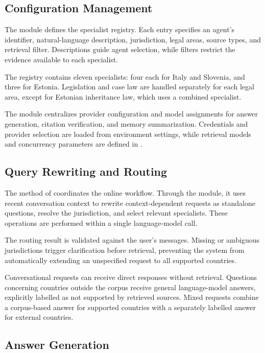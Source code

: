 \documentclass[a4paper,12pt]{report}
\begin{document}
\subsection{Configuration Management}

The  module defines the specialist registry.
Each entry specifies an agent's identifier, natural-language
description, jurisdiction, legal areas, source types, and retrieval
filter. Descriptions guide agent selection, while filters restrict
the evidence available to each specialist.

The registry contains eleven specialists: four each for Italy and
Slovenia, and three for Estonia. Legislation and case law are handled
separately for each legal area, except for Estonian inheritance law,
which uses a combined specialist.

The  module centralizes provider configuration
and model assignments for answer generation, citation verification,
and memory summarization. Credentials and provider selection are
loaded from environment settings, while retrieval models and
concurrency parameters are defined in .

\subsection{Query Rewriting and Routing}

The  method of  coordinates
the online workflow. Through the  module, it uses
recent conversation context to rewrite context-dependent requests
as standalone questions, resolve the jurisdiction, and select
relevant specialists. These operations are performed within a
single language-model call.

The routing result is validated against the user's messages.
Missing or ambiguous jurisdictions trigger clarification before
retrieval, preventing the system from automatically extending
an unspecified request to all supported countries.

Conversational requests can receive direct responses without
retrieval. Questions concerning countries outside the corpus
receive general language-model answers, explicitly labelled
as not supported by retrieved sources. Mixed requests combine
a corpus-based answer for supported countries with a separately
labelled answer for external countries.

\subsection{Answer Generation}
\end{document}
